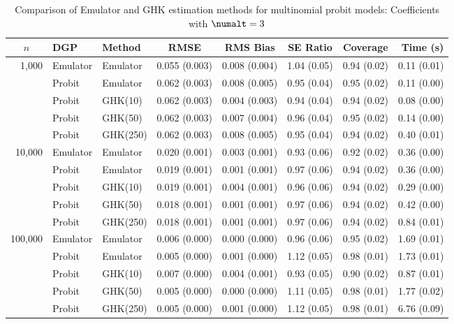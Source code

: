 \begin{table}[htbp]
\centering
\footnotesize
\begin{tabular}{@{}rllrrrrr@{}}
\toprule
\multicolumn{1}{c}{$n$} & \multicolumn{1}{l}{DGP} & \multicolumn{1}{l}{Method} & \multicolumn{1}{c}{RMSE} & \multicolumn{1}{c}{RMS Bias} & \multicolumn{1}{c}{SE Ratio} & \multicolumn{1}{c}{Coverage} & \multicolumn{1}{r}{Time (s)} \\
\midrule
\multirow{5}{*}{1,000} & Emulator & Emulator & 0.055 (0.003) & 0.008 (0.004) & 1.04 (0.05) & 0.94 (0.02) & 0.11 (0.01) \\
 & Probit & Emulator & 0.062 (0.003) & 0.008 (0.005) & 0.95 (0.04) & 0.95 (0.02) & 0.11 (0.00) \\
 & Probit & GHK(10) & 0.062 (0.003) & 0.004 (0.003) & 0.94 (0.04) & 0.94 (0.02) & 0.08 (0.00) \\
 & Probit & GHK(50) & 0.062 (0.003) & 0.007 (0.004) & 0.96 (0.04) & 0.95 (0.02) & 0.14 (0.00) \\
 & Probit & GHK(250) & 0.062 (0.003) & 0.008 (0.005) & 0.95 (0.04) & 0.94 (0.02) & 0.40 (0.01) \\
\midrule
\multirow{5}{*}{10,000} & Emulator & Emulator & 0.020 (0.001) & 0.003 (0.001) & 0.93 (0.06) & 0.92 (0.02) & 0.36 (0.00) \\
 & Probit & Emulator & 0.019 (0.001) & 0.001 (0.001) & 0.97 (0.06) & 0.94 (0.02) & 0.36 (0.00) \\
 & Probit & GHK(10) & 0.019 (0.001) & 0.004 (0.001) & 0.96 (0.06) & 0.94 (0.02) & 0.29 (0.00) \\
 & Probit & GHK(50) & 0.018 (0.001) & 0.001 (0.001) & 0.97 (0.06) & 0.94 (0.02) & 0.42 (0.00) \\
 & Probit & GHK(250) & 0.018 (0.001) & 0.001 (0.001) & 0.97 (0.06) & 0.94 (0.02) & 0.84 (0.01) \\
\midrule
\multirow{5}{*}{100,000} & Emulator & Emulator & 0.006 (0.000) & 0.000 (0.000) & 0.96 (0.06) & 0.95 (0.02) & 1.69 (0.01) \\
 & Probit & Emulator & 0.005 (0.000) & 0.001 (0.000) & 1.12 (0.05) & 0.98 (0.01) & 1.73 (0.01) \\
 & Probit & GHK(10) & 0.007 (0.000) & 0.004 (0.001) & 0.93 (0.05) & 0.90 (0.02) & 0.87 (0.01) \\
 & Probit & GHK(50) & 0.005 (0.000) & 0.000 (0.000) & 1.11 (0.05) & 0.98 (0.01) & 1.77 (0.02) \\
 & Probit & GHK(250) & 0.005 (0.000) & 0.001 (0.000) & 1.12 (0.05) & 0.98 (0.01) & 6.76 (0.09) \\
\bottomrule
\end{tabular}
\caption{Comparison of Emulator and GHK estimation methods for multinomial probit models: Coefficients with $\numalt=3$}
\label{tab:emulator_vs_ghk:3:beta}
\end{table}